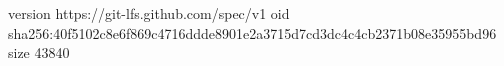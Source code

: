 version https://git-lfs.github.com/spec/v1
oid sha256:40f5102c8e6f869c4716ddde8901e2a3715d7cd3dc4c4cb2371b08e35955bd96
size 43840

